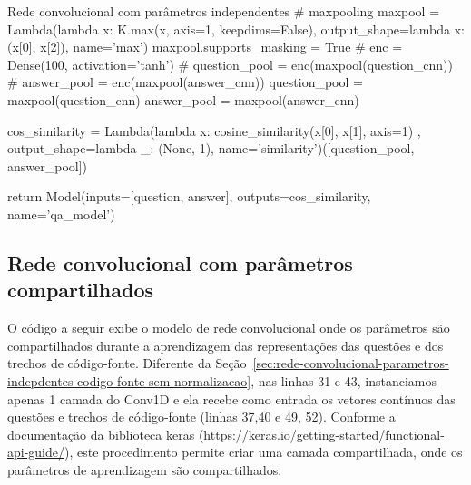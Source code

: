 \begin{mypython-linenumber}{Rede convolucional com parâmetros independentes}
        # maxpooling
        maxpool = Lambda(lambda x: K.max(x, axis=1, keepdims=False), output_shape=lambda x: (x[0], x[2]),
                         name='max')
        maxpool.supports_masking = True
        # enc = Dense(100, activation='tanh')
        # question_pool = enc(maxpool(question_cnn))
        # answer_pool = enc(maxpool(answer_cnn))
        question_pool = maxpool(question_cnn)
        answer_pool = maxpool(answer_cnn)

        cos_similarity = Lambda(lambda x: cosine_similarity(x[0], x[1], axis=1)
                                       , output_shape=lambda _: (None, 1), name='similarity')([question_pool,
                                                                                               answer_pool])

        return Model(inputs=[question, answer], outputs=cos_similarity,
                                   name='qa_model')
\end{mypython-linenumber}
\vspace{2cm}
\subsection{Rede convolucional com parâmetros compartilhados}

O código a seguir exibe o modelo de rede convolucional onde os parâmetros são compartilhados durante a aprendizagem das representações das questões e dos trechos de código-fonte. Diferente da Seção~\ref{sec:rede-convolucional-parametros-indepdentes-codigo-fonte-sem-normalizacao}, nas linhas 31 e 43, instanciamos apenas 1 camada do Conv1D e ela recebe como entrada os vetores contínuos das questões e trechos de código-fonte (linhas 37,40 e 49, 52). Conforme a documentação da biblioteca \Gls{keras} (\url{https://keras.io/getting-started/functional-api-guide/}), este procedimento permite criar uma camada compartilhada, onde os parâmetros de aprendizagem são compartilhados.


